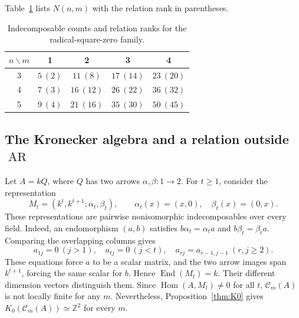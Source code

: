 \documentclass[pdflatex,sn-mathphys-num]{sn-jnl}
\numberwithin{equation}{section}
\theoremstyle{definition}
\theoremstyle{remark}\newtheorem{remark}[theorem]{Remark}
\newcommand{\C}{\mathcal C}
\newcommand{\Hom}{\operatorname{Hom}}
\newcommand{\End}{\operatorname{End}}
\newcommand{\AR}{\operatorname{AR}}
\begin{document}
Table~\ref{tab:counts} lists $N(n,m)$ with the relation rank in parentheses.
\par
\begin{table}[!htbp]
\centering
\caption{Indecomposable counts and relation ranks for the radical-square-zero family.}\label{tab:counts}
\begin{tabular}{ccccc}
\toprule
$n\backslash m$ & 1 & 2 & 3 & 4\\
\midrule
3 & $5\ (2)$ & $11\ (8)$ & $17\ (14)$ & $23\ (20)$\\
4 & $7\ (3)$ & $16\ (12)$ & $26\ (22)$ & $36\ (32)$\\
5 & $9\ (4)$ & $21\ (16)$ & $35\ (30)$ & $50\ (45)$\\
\bottomrule
\end{tabular}
\end{table}
\par

\FloatBarrier


\subsection{The Kronecker algebra and a relation outside \texorpdfstring{$\AR$}{AR}}
Let $A=kQ$, where $Q$ has two arrows $\alpha,\beta:1\to2$.
For $t\geq1$, consider the representation
\[
 M_t=(k^t,k^{t+1};\alpha_t,\beta_t),\qquad
 \alpha_t(x)=(x,0),\quad\beta_t(x)=(0,x).
\]
These representations are pairwise nonisomorphic indecomposables over
every field. Indeed, an endomorphism $(a,b)$ satisfies
$b\alpha_t=\alpha_t a$ and $b\beta_t=\beta_t a$. Comparing the
overlapping columns gives
\[
 a_{1j}=0\ (j>1),\quad a_{tj}=0\ (j<t),\quad
 a_{rj}=a_{r-1,j-1}\ (r,j\geq2).
\]
These equations force $a$ to be a scalar matrix, and the two arrow
images span $k^{t+1}$, forcing the same scalar for $b$. Hence
$\End(M_t)=k$. Their different dimension vectors distinguish them.
Since $\Hom(A,M_t)\ne0$ for all $t$, $\C_m(A)$ is not locally finite
for any $m$. Nevertheless, Proposition~\ref{thm:K0} gives
$K_0(\C_m(A))\simeq\mathbb Z^2$ for every $m$.
\end{document}
